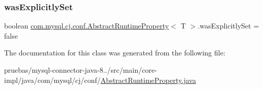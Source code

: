 \subsubsection{\texorpdfstring{was\+Explicitly\+Set}{wasExplicitlySet}}
{\footnotesize\ttfamily boolean \mbox{\hyperlink{classcom_1_1mysql_1_1cj_1_1conf_1_1_abstract_runtime_property}{com.\+mysql.\+cj.\+conf.\+Abstract\+Runtime\+Property}}$<$ T $>$.was\+Explicitly\+Set = false\hspace{0.3cm}{\ttfamily [protected]}}



The documentation for this class was generated from the following file\+:\begin{DoxyCompactItemize}
\item 
pruebas/mysql-\/connector-\/java-\/8../src/main/core-\/impl/java/com/mysql/cj/conf/\mbox{\hyperlink{_abstract_runtime_property_8java}{Abstract\+Runtime\+Property.\+java}}\end{DoxyCompactItemize}
